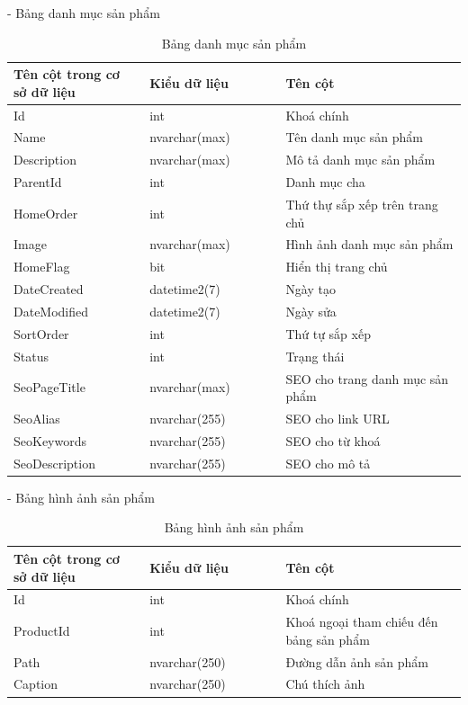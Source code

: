- Bảng danh mục sản phẩm
\begin{longtable}[htp]{ |m{0.3\linewidth}|m{0.3\linewidth}|m{0.4\linewidth}|}
\caption{Bảng danh mục sản phẩm \label{database}}\\
\hline
Tên cột trong cơ sở dữ liệu & Kiểu dữ liệu & Tên cột  \\
\hline
Id&int&Khoá chính\\
\hline
Name&nvarchar(max)&Tên danh mục sản phẩm\\
\hline
Description&nvarchar(max)&Mô tả danh mục sản phẩm\\
\hline
ParentId&int&Danh mục cha\\
\hline
HomeOrder&int&Thứ thự sắp xếp trên trang chủ\\
\hline
Image&nvarchar(max)&Hình ảnh danh mục sản phẩm\\
\hline
HomeFlag&bit&Hiển thị trang chủ\\
\hline
DateCreated&datetime2(7)&Ngày tạo\\
\hline
DateModified&datetime2(7)&Ngày sửa\\
\hline
SortOrder&int&Thứ tự sắp xếp\\
\hline
Status&int&Trạng thái\\
\hline
 SeoPageTitle&nvarchar(max)&SEO cho trang danh mục sản phẩm\\
 \hline
 SeoAlias&nvarchar(255)&SEO cho link URL\\
 \hline
 SeoKeywords&nvarchar(255)&SEO cho từ khoá\\
 \hline
 SeoDescription&nvarchar(255)&SEO cho mô tả \\
 \hline
\end{longtable}

- Bảng hình ảnh sản phẩm
\begin{longtable}[htp]{ |m{0.3\linewidth}|m{0.3\linewidth}|m{0.4\linewidth}|}
\caption{Bảng hình ảnh sản phẩm \label{database}}\\
\hline
Tên cột trong cơ sở dữ liệu & Kiểu dữ liệu & Tên cột  \\
\hline
Id&int&Khoá chính\\
\hline
ProductId&int&Khoá ngoại tham chiếu đến bảng sản phẩm\\
\hline
Path&nvarchar(250)&Đường dẫn ảnh sản phẩm\\
\hline
Caption&nvarchar(250)&Chú thích ảnh\\
\hline
\end{longtable}


